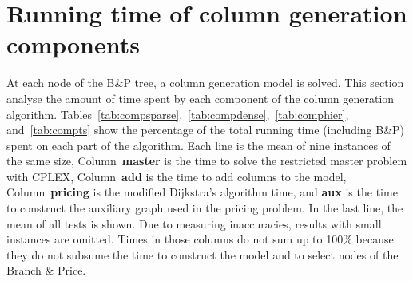 \section{Running time of column generation components}
\label{sec:pritime}

At each node of the B\&P tree, a column generation model is solved.
This section analyse the amount of time spent by each component of the column generation algorithm.
Tables~\ref{tab:compsparse},~\ref{tab:compdense},~\ref{tab:comphier}, and~\ref{tab:compts} show the percentage of the total running time (including B\&P) spent on each part of the algorithm.
Each line is the mean of nine instances of the same size, Column~\textbf{master} is the time to solve the restricted master problem with CPLEX, Column~\textbf{add} is the time to add columns to the model, Column~\textbf{pricing} is the modified Dijkstra's algorithm time, and \textbf{aux} is the time to construct the auxiliary graph used in the pricing problem.
In the last line, the mean of all tests is shown.
Due to measuring inaccuracies, results with small instances are omitted.
Times in those columns do not sum up to 100\% because they do not subsume the time to construct the model and to select nodes of the Branch \& Price.

